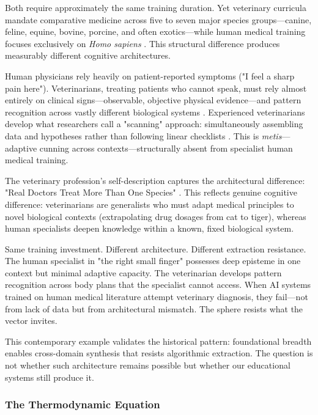 Both require approximately the same training duration. Yet veterinary curricula mandate comparative medicine across five to seven major species groups—canine, feline, equine, bovine, porcine, and often exotics—while human medical training focuses exclusively on \textit{Homo sapiens} \citep{ross_vet_school, pmc_veterinary_value}. This structural difference produces measurably different cognitive architectures.

Human physicians rely heavily on patient-reported symptoms ("I feel a sharp pain here"). Veterinarians, treating patients who cannot speak, must rely almost entirely on clinical signs—observable, objective physical evidence—and pattern recognition across vastly different biological systems \citep{pmc_veterinary_value, jvme_clinical_reasoning}. Experienced veterinarians develop what researchers call a "scanning" approach: simultaneously assembling data and hypotheses rather than following linear checklists \citep{jvme_clinical_reasoning}. This is \textit{metis}—adaptive cunning across contexts—structurally absent from specialist human medical training.

The veterinary profession's self-description captures the architectural difference: "Real Doctors Treat More Than One Species" \citep{pmc_veterinary_value}. This reflects genuine cognitive difference: veterinarians are generalists who must adapt medical principles to novel biological contexts (extrapolating drug dosages from cat to tiger), whereas human specialists deepen knowledge within a known, fixed biological system.

Same training investment. Different architecture. Different extraction resistance. The human specialist in "the right small finger" possesses deep episteme in one context but minimal adaptive capacity. The veterinarian develops pattern recognition across body plans that the specialist cannot access. When AI systems trained on human medical literature attempt veterinary diagnosis, they fail—not from lack of data but from architectural mismatch. The sphere resists what the vector invites.

This contemporary example validates the historical pattern: foundational breadth enables cross-domain synthesis that resists algorithmic extraction. The question is not whether such architecture remains possible but whether our educational systems still produce it.

\subsubsection{The Thermodynamic Equation}

